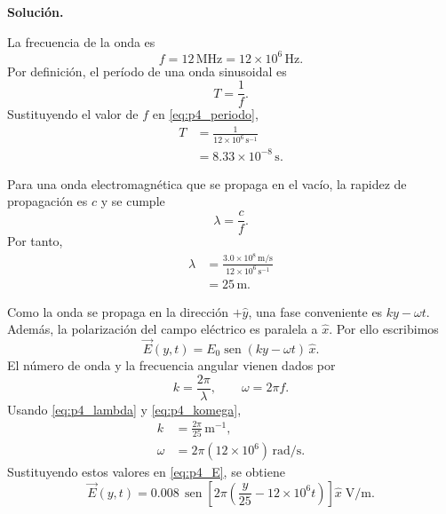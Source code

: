 \documentclass[11pt]{article}
\newcommand{\soluciontitulo}{%
    \par\medskip
    \noindent\textbf{Soluci\'on.}\par
    \smallskip
}
\newcommand{\sen}{\operatorname{sen}}
\begin{document}
\soluciontitulo

La frecuencia de la onda es
\begin{equation*}
    f=12\,\mathrm{MHz}=12\times10^6\,\mathrm{Hz}.
\end{equation*}
Por definici\'on, el per\'iodo de una onda sinusoidal es
\begin{equation}
    T=\frac{1}{f}.
    \label{eq:p4_periodo}
\end{equation}
Sustituyendo el valor de $f$ en \eqref{eq:p4_periodo},
\begin{align*}
    T&=\frac{1}{12\times10^6\,\mathrm{s^{-1}}}\\
     &=8.33\times10^{-8}\,\mathrm{s}.
\end{align*}

Para una onda electromagn\'etica que se propaga en el vac\'io, la rapidez de propagaci\'on es $c$ y se cumple
\begin{equation}
    \lambda=\frac{c}{f}.
    \label{eq:p4_lambda}
\end{equation}
Por tanto,
\begin{align*}
    \lambda&=\frac{3.0\times10^8\,\mathrm{m/s}}{12\times10^6\,\mathrm{s^{-1}}}\\
            &=25\,\mathrm{m}.
\end{align*}

Como la onda se propaga en la direcci\'on $+\hat{y}$, una fase conveniente es $ky-\omega t$. Adem\'as, la polarizaci\'on del campo el\'ectrico es paralela a $\hat{x}$. Por ello escribimos
\begin{equation}
    \vec E(y,t)=E_0\sen(ky-\omega t)\,\hat{x}.
    \label{eq:p4_E}
\end{equation}
El n\'umero de onda y la frecuencia angular vienen dados por
\begin{equation}
    k=\frac{2\pi}{\lambda},
    \qquad
    \omega=2\pi f.
    \label{eq:p4_komega}
\end{equation}
Usando \eqref{eq:p4_lambda} y \eqref{eq:p4_komega},
\begin{align*}
    k&=\frac{2\pi}{25}\,\mathrm{m^{-1}},\\
    \omega&=2\pi(12\times10^6)\,\mathrm{rad/s}.
\end{align*}
Sustituyendo estos valores en \eqref{eq:p4_E}, se obtiene
\begin{equation*}
    \vec E(y,t)=0.008\,\sen\!\left[2\pi\left(\frac{y}{25}-12\times10^6t\right)\right]\hat{x}\;\mathrm{V/m}.
\end{equation*}
\end{document}
